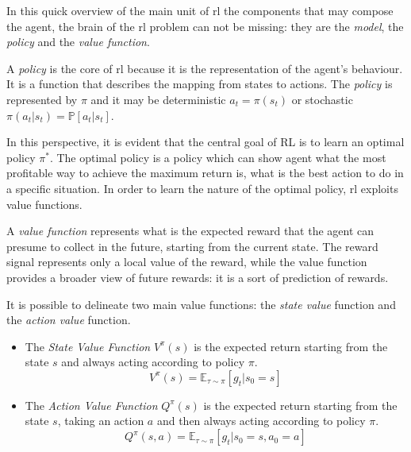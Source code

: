 In this quick overview of the main unit of \acrshort{rl} the components that may compose the agent, the brain of the \acrshort{rl} problem can not be missing: they are the \textit{model}, the \textit{policy} and the \textit{value function}.


A \textit{policy} is the core of \acrshort{rl} because it is the representation of the agent's behaviour. It is a function that describes the mapping from states to actions.  The \textit{policy} is represented by $\pi$ and it may be deterministic  $a_t = \pi(s_t)$  or stochastic $\pi(a_t|s_t) = \mathbb{P}[a_t | s_t]$.

In this perspective, it is evident that the central goal of RL is to learn an optimal policy $\pi^*$. The optimal policy is a policy which can show agent what the most profitable way to achieve the maximum return is, what is the best action to do in a specific situation. In order to learn the nature of the optimal policy, \acrshort{rl} exploits value functions.

A \textit{value function} represents what is the expected reward that the agent can presume to collect in the future, starting from the current state. The reward signal represents only a local value of the reward, while the value function provides a broader view of future rewards: it is a sort of prediction of rewards.

It is possible to delineate two main value functions: the \textit{state value} function and the \textit{action value} function.

\begin{itemize}
	\item The \textit{State Value Function} $V^\pi(s)$ is the expected return starting from the state $s$ and always acting according to policy $\pi$.
	\begin{equation} \label{eq:statevalue}
		V^\pi(s) = \mathbb{E}_{\tau \sim \pi}[g_t | s_0 = s]
	\end{equation}
	\item The \textit{Action Value Function} $Q^\pi(s)$ is the expected return starting from the state $s$, taking an action $a$ and then always acting according to policy $\pi$.
	\begin{equation} \label{eq:actionvalue}
	Q^\pi(s, a) = \mathbb{E}_{\tau \sim \pi}[g_t | s_0 = s, a_0 = a]
	\end{equation}
\end{itemize}


